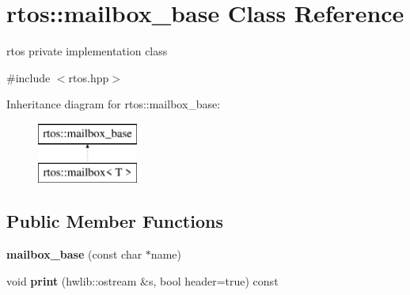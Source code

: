 \hypertarget{classrtos_1_1mailbox__base}{}\section{rtos\+:\+:mailbox\+\_\+base Class Reference}
\label{classrtos_1_1mailbox__base}


rtos private implementation class  




{\ttfamily \#include $<$rtos.\+hpp$>$}

Inheritance diagram for rtos\+:\+:mailbox\+\_\+base\+:\begin{figure}[H]
\begin{center}
\leavevmode
\includegraphics[height=2.000000cm]{classrtos_1_1mailbox__base}
\end{center}
\end{figure}
\subsection*{Public Member Functions}
\begin{DoxyCompactItemize}
\item 
{\bfseries mailbox\+\_\+base} (const char $\ast$name)\hypertarget{classrtos_1_1mailbox__base_a647b58f572b4e387afe926eb4aa1592d}{}\label{classrtos_1_1mailbox__base_a647b58f572b4e387afe926eb4aa1592d}

\item 
void {\bfseries print} (hwlib\+::ostream \&s, bool header=true) const \hypertarget{classrtos_1_1mailbox__base_a4d45169c0f5dd6a18cc1c6218d248126}{}\label{classrtos_1_1mailbox__base_a4d45169c0f5dd6a18cc1c6218d248126}

\end{DoxyCompactItemize}

